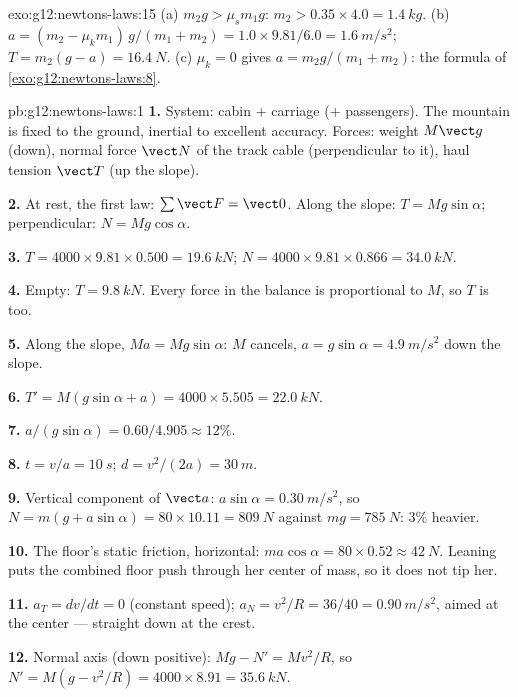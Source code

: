 \begin{solution}{exo:g12:newtons-laws:15}
(a) $m_2 g > \mu_s m_1 g$: $m_2 > 0.35 \times 4.0 = \qty{1.4}{kg}$.
(b) $a = (m_2 - \mu_k m_1)\,g/(m_1 + m_2) = 1.0 \times 9.81/6.0 =
\qty{1.6}{m/s^2}$; $T = m_2(g - a) = \qty{16.4}{N}$.
(c) $\mu_k = 0$ gives $a = m_2 g/(m_1 + m_2)$: the formula of
\cref{exo:g12:newtons-laws:8}.
\end{solution}

\begin{solution}{pb:g12:newtons-laws:1}
\textbf{1.} System: cabin $+$ carriage ($+$ passengers). The mountain
is fixed to the ground, inertial to excellent accuracy. Forces:
weight $M\vect g$ (down), normal force $\vect N$ of the track cable
(perpendicular to it), haul tension $\vect T$ (up the slope).

\textbf{2.} At rest, the first law: $\sum \vect F = \vect 0$. Along
the slope: $T = Mg\sin\alpha$; perpendicular: $N = Mg\cos\alpha$.

\textbf{3.} $T = 4000 \times 9.81 \times 0.500 = \qty{19.6}{kN}$;
$N = 4000 \times 9.81 \times 0.866 = \qty{34.0}{kN}$.

\textbf{4.} Empty: $T = \qty{9.8}{kN}$. Every force in the balance is
proportional to $M$, so $T$ is too.

\textbf{5.} Along the slope, $Ma = Mg\sin\alpha$: $M$ cancels,
$a = g\sin\alpha = \qty{4.9}{m/s^2}$ down the slope.

\textbf{6.} $T' = M(g\sin\alpha + a) = 4000 \times 5.505 =
\qty{22.0}{kN}$.

\textbf{7.} $a/(g\sin\alpha) = 0.60/4.905 \approx 12\%$.

\textbf{8.} $t = v/a = \qty{10}{s}$; $d = v^2/(2a) = \qty{30}{m}$.

\textbf{9.} Vertical component of $\vect a$: $a\sin\alpha =
\qty{0.30}{m/s^2}$, so $N = m(g + a\sin\alpha) = 80 \times 10.11 =
\qty{809}{N}$ against $mg = \qty{785}{N}$: $3\%$ heavier.

\textbf{10.} The floor's static friction, horizontal:
$ma\cos\alpha = 80 \times 0.52 \approx \qty{42}{N}$. Leaning puts the
combined floor push through her center of mass, so it does not tip
her.

\textbf{11.} $a_T = dv/dt = 0$ (constant speed);
$a_N = v^2/R = 36/40 = \qty{0.90}{m/s^2}$, aimed at the center ---
straight down at the crest.

\textbf{12.} Normal axis (down positive): $Mg - N' = Mv^2/R$, so
$N' = M(g - v^2/R) = 4000 \times 8.91 = \qty{35.6}{kN}$.


\end{solution}
